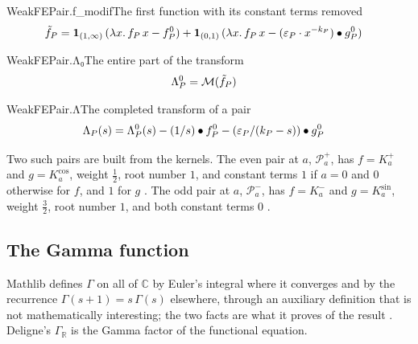 \documentclass{article}
\begin{document}
\begin{leandefinition}[def, sum=Q9DaJqWm5C]{WeakFEPair.f_modif}{The first function with its constant terms removed}
\label{def:WeakFEPair.f_modif}
\[\LeanMath{\begin{aligned}\tilde{f}_{P} &= \mathbf{1}_{(1, \infty)}\,(\lambda x.\,f_{P}\,x - f^{0}_{P}) + \mathbf{1}_{(0, 1)}\,(\lambda x.\,f_{P}\,x - (\varepsilon_{P} \cdot x^{-k_{P}}) \bullet g^{0}_{P})\end{aligned}}\]
\end{leandefinition}

\begin{leandefinition}[def, sum=iCqrfjPw5K]{WeakFEPair.Λ₀}{The entire part of the transform}
\label{def:WeakFEPair.u39bu2080}
\[\LeanMath{\begin{aligned}\Lambda^{0}_{P} &= \mathcal{M}(\tilde{f}_{P})\end{aligned}}\]
\end{leandefinition}

\begin{leandefinition}[def, sum=2zctRaz6RT]{WeakFEPair.Λ}{The completed transform of a pair}
\label{def:WeakFEPair.u39b}
\[\LeanMath{\begin{aligned}\Lambda_{P}(s) &= \Lambda^{0}_{P}(s) - (1 / s) \bullet f^{0}_{P} - (\varepsilon_{P} / (k_{P} - s)) \bullet g^{0}_{P}\end{aligned}}\]
\end{leandefinition}

Two such pairs are built from the kernels. The even pair at $a$,
$\mathcal{P}^{+}_{a}$, has $f = K^{+}_{a}$ and $g = K^{\cos}_{a}$, weight
$\tfrac12$, root number $1$, and constant terms $1$ if $a = 0$ and $0$
otherwise for $f$, and $1$ for $g$
. The odd pair at $a$,
$\mathcal{P}^{-}_{a}$, has $f = K^{-}_{a}$ and $g = K^{\sin}_{a}$, weight
$\tfrac32$, root number $1$, and both constant terms $0$
.

\subsection{The Gamma function}

Mathlib defines $\Gamma$ on all of $\mathbb{C}$ by Euler's integral where
it converges and by the recurrence $\Gamma(s + 1) = s\,\Gamma(s)$
elsewhere, through an auxiliary definition that is not mathematically
interesting; the two facts are what it proves of the result
. Deligne's $\Gamma_{\mathbb{R}}$ is the Gamma
factor of the functional equation.
\end{document}
